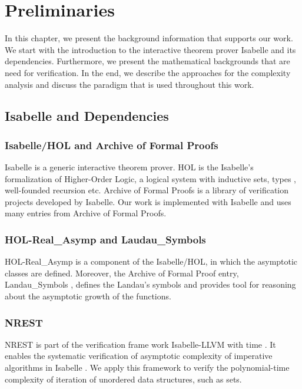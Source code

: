 \newcommand{\red}{\leq_p}
\newcommand{\problem}[3]{
\begin{definition}
    {#1} \\
    \textbf{Input}: {#2}\\
    \textbf{Output}: {#3}
\end{definition}
}
\newcommand{\bigO}[1]{\mathcal{O}({#1})}

\chapter{Preliminaries}\label{chapter:preliminaries}
In this chapter, we present the background information that supports our work. 
We start with the introduction to the interactive theorem prover Isabelle and its dependencies. 
Furthermore, we present the mathematical backgrounds that are need for verification. 
In the end, we describe the approaches for the complexity analysis and discuss the paradigm 
that is used throughout this work.
\section{Isabelle and Dependencies}
\subsection*{Isabelle/HOL and Archive of Formal Proofs}
Isabelle \cite{wenzel2004isabelle} is a generic interactive theorem prover. HOL is the Isabelle's formalization of Higher-Order Logic, 
a logical system with inductive sets, types , well-founded recursion etc. 
Archive of Formal Proofs \cite{AFP} is a library of verification projects developed by Isabelle. 
Our work is implemented with Isabelle and uses many entries from Archive of Formal 
Proofs.

\subsection*{HOL-Real\_Asymp and Laudau\_Symbols}
HOL-Real\_Asymp is a component of the Isabelle/HOL, in which the asymptotic 
classes are defined. Moreover, the Archive of Formal Proof entry, Landau\_Symbols \cite{Landau_Symbols-AFP}, 
defines the Landau's symbols and provides tool for reasoning about the asymptotic
growth of the functions. 

\subsection*{NREST}
NREST is part of the verification frame work Isabelle-LLVM with time \cite{haslbeck2021verified}. It enables 
the systematic verification of asymptotic complexity of imperative algorithms in Isabelle \cite{zhan2018verifying}. 
We apply this framework 
to verify the polynomial-time complexity of iteration of unordered data structures, such as sets.

